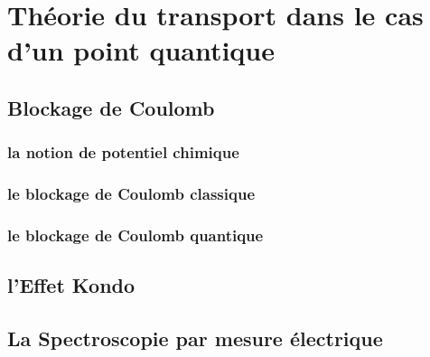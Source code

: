 \chapter{Théorie du transport dans le cas d'un point quantique}
\section{Blockage de Coulomb}
\subsection*{la notion de potentiel chimique}
\subsection*{le blockage de Coulomb classique}
\subsection*{le blockage de Coulomb quantique}
\section{l'Effet Kondo}
\section{La Spectroscopie par mesure électrique}